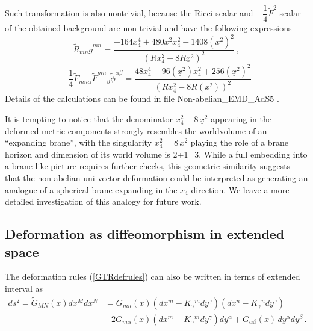 \documentclass[12pt, utf8]{article}
\numberwithin{equation}{section}
\begin{document}
Such transformation is also nontrivial, because the Ricci scalar and $ - \dfrac{1}{4} \tilde{F}^2$ scalar of the obtained background are non-trivial and have the following expressions
\begin{equation}
   \tilde{R}_{mn} \tilde{g}^{mn} = \frac{-164 x_{4}^4+480 \underline{x}^2 x_{4}^2-1408 \left(\underline{x}^2\right)^2}{\left(R x_{4}^2-8 R \underline{x}^2\right)^2} \, ,
\end{equation}
\begin{equation}
   - \dfrac{1}{4} \tilde{F}_{m n \alpha} \tilde{F}^{m n}{}_{\beta} \tilde{\phi}^{\alpha \beta} = \frac{48 x_{4}^4-96 \left(\underline{x}^2\right) x_{4}^2+256 \left(\underline{x}^2\right)^2}{\left(R x_{4}^2-8 R \left(\underline{x}^2\right)\right)^2}
\end{equation}
Details of the calculations can be found in file Non-abelian\_EMD\_AdS5 \cite{Gubarev:2025nonabelianuni}.

It is tempting to notice that the denominator $x_4^2 - 8\,\underline{x}^2$ appearing in the deformed metric components strongly resembles the worldvolume of an ``expanding brane'', with the singularity $x_4^2 = 8\,\underline{x}^2$ playing the role of a brane horizon and dimension of its world volume is 2+1=3. While a full embedding into a brane‑like picture requires further checks, this geometric similarity suggests that the non‑abelian uni‑vector deformation could be interpreted as generating an analogue of a spherical brane expanding in the $x_4$ direction. We leave a more detailed investigation of this analogy for future work.


\subsection{Deformation as diffeomorphism in extended space}\label{GTRdiffeo}

The deformation rules (\ref{GTRdefrules}) can also be written in terms of extended interval as
\begin{equation}
 \begin{aligned}
        ds^2 = \tilde{G}_{M N}(x)dx^{M} dx^{N} & = G_{m n}(x) (dx^{m} - K_{\gamma}{}^{m} dy^{\gamma} ) (dx^{n} - K_{\gamma}{}^{n} dy^{\gamma} ) \\
        &+ 2 G_{m \alpha}(x)  (dx^{m} - K_{\gamma}{}^{m} dy^{\gamma} ) dy^{\alpha} + G_{\alpha \beta}(x) \,dy^{\alpha}dy^{\beta} \, .
 \end{aligned}
 \end{equation}
\end{document}
